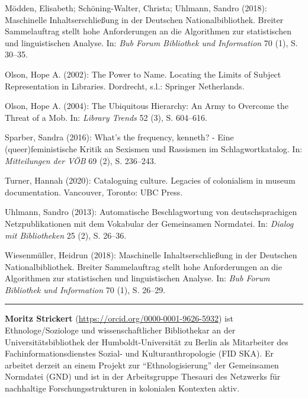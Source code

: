 \documentclass[a4paper,
fontsize=11pt,
oneside,
numbers=noperiodatend,
parskip=half-,
bibliography=totoc,
final
]{scrartcl}
\begin{document}
Mödden, Elisabeth; Schöning-Walter, Christa; Uhlmann, Sandro (2018):
Maschinelle Inhaltserschließung in der Deutschen Nationalbibliothek.
Breiter Sammelauftrag stellt hohe Anforderungen an die Algorithmen zur
statistischen und linguistischen Analyse. In: \emph{Bub Forum Bibliothek
und Information} 70 (1), S. 30--35.

Olson, Hope A. (2002): The Power to Name. Locating the Limits of Subject
Representation in Libraries. Dordrecht, s.l.: Springer Netherlands.

Olson, Hope A. (2004): The Ubiquitous Hierarchy: An Army to Overcome the
Threat of a Mob. In: \emph{Library Trends} 52 (3), S. 604--616.

Sparber, Sandra (2016): What's the frequency, kenneth? - Eine
(queer)feministische Kritik an Sexismen und Rassismen im
Schlagwortkatalog. In: \emph{Mitteilungen der VÖB} 69 (2), S. 236--243.

Turner, Hannah (2020): Cataloguing culture. Legacies of colonialism in
museum documentation. Vancouver, Toronto: UBC Press.

Uhlmann, Sandro (2013): Automatische Beschlagwortung von
deutschsprachigen Netzpublikationen mit dem Vokabular der Gemeinsamen
Normdatei. In: \emph{Dialog mit Bibliotheken} 25 (2), S. 26--36.

Wiesenmüller, Heidrun (2018): Maschinelle Inhaltserschließung in der
Deutschen Nationalbibliothek. Breiter Sammelauftrag stellt hohe
Anforderungen an die Algorithmen zur statistischen und linguistischen
Analyse. In: \emph{Bub Forum Bibliothek und Information} 70 (1), S.
26--29.

\begin{center}\rule{0.5\linewidth}{0.5pt}\end{center}

\textbf{Moritz Strickert} (\url{https://orcid.org/0000-0001-9626-5932})
ist Ethnologe/Soziologe und wissenschaftlicher Bibliothekar an der
Universitätsbibliothek der Humboldt-Universität zu Berlin als
Mitarbeiter des Fachinformationsdienstes Sozial- und Kulturanthropologie
(FID SKA). Er arbeitet derzeit an einem Projekt zur ``Ethnologisierung''
der Gemeinsamen Normdatei (GND) und ist in der Arbeitsgruppe Thesauri
des Netzwerks für nachhaltige Forschungsstrukturen in kolonialen
Kontexten aktiv.
\end{document}
